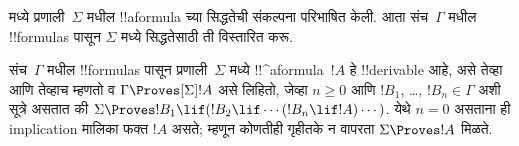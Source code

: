 \documentclass[../../../include/open-logic-section]{subfiles}
\begin{document}


 मध्ये प्रणाली~$\Sigma$ मधील
!!a{formula} च्या सिद्धतेची संकल्पना परिभाषित केली.
आता संच~$\Gamma$ मधील !!{formula}s पासून
$\Sigma$ मध्ये सिद्धतेसाठी ती विस्तारित करू.

\begin{defn}
  संच~$\Gamma$ मधील !!{formula}s पासून
  प्रणाली~$\Sigma$ मध्ये !!^a{formula}~$!A$
  हे !!{derivable} आहे, असे तेव्हा आणि तेव्हाच
  म्हणतो व $\Gamma \Proves[\Sigma] !A$ असे लिहितो,
  जेव्हा $n \geq 0$ आणि $!B_1$, \dots, $!B_n \in \Gamma$ अशी
  सूत्रे असतात की
  $\Sigma \Proves !B_1 \lif (!B_2 \lif \cdots (!B_n \lif !A)
  \cdots)$.
येथे $n=0$ असताना ही implication मालिका फक्त $!A$ असते;
म्हणून कोणतीही गृहीतके न वापरता $\Sigma \Proves !A$ मिळते.
\end{defn}
\end{document}
